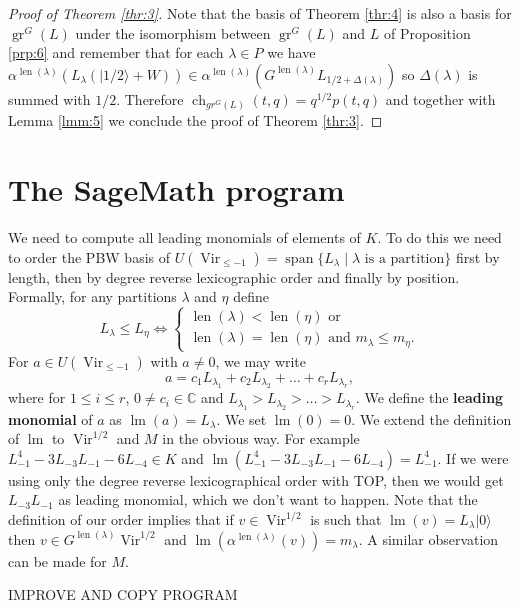 \documentclass[12pt,a4paper]{article}
\DeclareMathOperator{\Vir}{Vir}
\DeclareMathOperator{\gr}{gr}
\DeclareMathOperator{\ch}{ch}
\DeclareMathOperator{\lm}{lm}
\DeclareMathOperator{\vspan}{span}
\DeclareMathOperator{\len}{len}
\newcommand{\vac}{|0\rangle}
\newcommand{\vachalf}{|1/2\rangle}
\begin{document}
\begin{proof}[Proof of Theorem \ref{thr:3}]
  Note that the basis of Theorem \ref{thr:4} is also a basis for $\gr^G(L)$ under the isomorphism between $\gr^G(L)$ and $L$ of Proposition \ref{prp:6} and remember that for each $\lambda\in P$ we have $\alpha^{\len(\lambda)}(L_\lambda(\vachalf+W))\in \alpha^{\len(\lambda)}(G^{\len(\lambda)}L_{1/2+\Delta(\lambda)})$ so $\Delta(\lambda)$ is summed with $1/2$.
  Therefore $\ch_{gr^G(L)}(t,q)=q^{1/2}p(t,q)$ and together with Lemma \ref{lmm:5} we conclude the proof of Theorem \ref{thr:3}.
\end{proof}

\appendix
\section{The SageMath program}
\label{sec:sagem-progr-comp}

We need to compute all leading monomials of elements of $K$.
To do this we need to order the PBW basis of $U(\Vir_{\le-1})=\vspan\{L_\lambda\mid \lambda\text{ is a partition}\}$ first by length, then by degree reverse lexicographic order and finally by position.
Formally, for any partitions $\lambda$ and $\eta$ define
\begin{equation*}
  L_\lambda\le L_\eta \iff
  \begin{cases}
    \len(\lambda)<\len(\eta) \text{ or }\\
    \len(\lambda)=\len(\eta)\text{ and } m_\lambda\le m_\eta.
  \end{cases}
\end{equation*}
For $a\in U(\Vir_{\le -1})$ with $a\neq 0$, we may write
\begin{equation*}
  a = c_1L_{\lambda_1}+c_2L_{\lambda_2}+\dots+c_rL_{\lambda_r},
\end{equation*}
where for $1\le i\le r$, $0\neq c_i\in \mathbb{C}$ and $L_{\lambda_1}>L_{\lambda_2}>\dots>L_{\lambda_r}$.
We define the \textbf{leading monomial} of $a$ as $\lm(a)=L_\lambda$. 
We set $\lm(0)=0$.
We extend the definition of $\lm$ to $\Vir^{1/2}$ and $M$ in the obvious way.
For example $L_{-1}^4 - 3L_{-3}L_{-1} - 6L_{-4}\in K$ and $\lm(L_{-1}^4 - 3L_{-3}L_{-1} - 6L_{-4})=L_{-1}^4$.
If we were using only the degree reverse lexicographical order with TOP, then we would get $L_{-3}L_{-1}$ as leading monomial, which we don't want to happen.
Note that the definition of our order implies that if $v\in \Vir^{1/2}$ is such that $\lm(v)=L_\lambda\vac$ then $v\in G^{\len(\lambda)}\Vir^{1/2}$ and $\lm(\alpha^{\len(\lambda)}(v))=m_\lambda$.
A similar observation can be made for $M$.

IMPROVE AND COPY PROGRAM  



\end{document}
